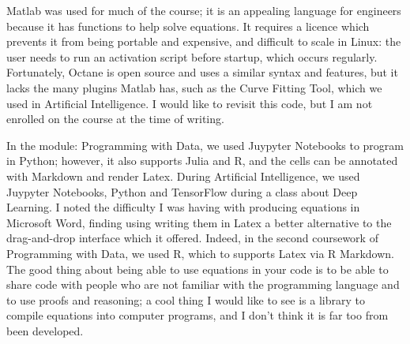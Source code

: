 \documentclass{article}
\begin{document}
Matlab was used for much of the course; it is an appealing language for engineers because it has functions to help solve equations. It requires a licence which prevents it from being portable and expensive, and difficult to scale in Linux: the user needs to run an activation script before startup, which occurs regularly. Fortunately, Octane is open source and uses a similar syntax and features, but it lacks the many plugins Matlab has, such as the Curve Fitting Tool, which we used in Artificial Intelligence. I would like to revisit this code, but I am not enrolled on the course at the time of writing.

In the module: Programming with Data, we used Juypyter Notebooks to program in Python; however, it also supports Julia and R, and the cells can be annotated with Markdown and render Latex. During Artificial Intelligence, we used Juypyter Notebooks, Python and TensorFlow during a class about Deep Learning. I noted the difficulty I was having with producing equations in Microsoft Word, finding using writing them in Latex a better alternative to the drag-and-drop interface which it offered. Indeed, in the second coursework of Programming with Data, we used  R, which to supports Latex via R Markdown. The good thing about being able to use equations in your code is to be able to share code with people who are not familiar with the programming language and to use proofs and reasoning; a cool thing I would like to see is a library to compile equations into computer programs, and I don't think it is far too from been developed.

\newpage

 
\end{document}
